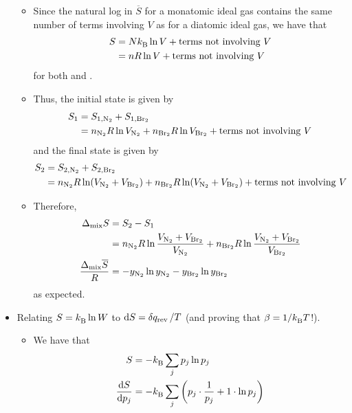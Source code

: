 \documentclass[../notes.tex]{subfiles}
\begin{document}
\begin{itemize}
    \begin{itemize}
        \item Since the natural log in $\overline{S}$ for a monatomic ideal gas contains the same number of terms involving $V$ as for a diatomic ideal gas, we have that
        \begin{align*}
            S &= N{k_\text{B}^{}}\ln V+\text{terms not involving }V\\
            &= nR\ln V+\text{terms not involving }V
        \end{align*}
        for both  and .
        \item Thus, the initial state is given by
        \begin{align*}
            S_1 &= S_{1,\ce{N2}}+S_{1,\ce{Br2}}\\
            &= n_{\ce{N2}}R\ln V_{\ce{N2}}+n_{\ce{Br2}}R\ln V_{\ce{Br2}}+\text{terms not involving }V
        \end{align*}
        and the final state is given by
        \begin{align*}
            S_2 &= S_{2,\ce{N2}}+S_{2,\ce{Br2}}\\
            &= n_{\ce{N2}}R\ln(V_{\ce{N2}}+V_{\ce{Br2}})+n_{\ce{Br2}}R\ln(V_{\ce{N2}}+V_{\ce{Br2}})+\text{terms not involving }V
        \end{align*}
        \item Therefore,
        \begin{align*}
            \Delta_\text{mix}S &= S_2-S_1\\
            &= n_{\ce{N2}}R\ln\frac{V_{\ce{N2}}+V_{\ce{Br2}}}{V_{\ce{N2}}}+n_{\ce{Br2}}R\ln\frac{V_{\ce{N2}}+V_{\ce{Br2}}}{V_{\ce{Br2}}}\\
            \frac{\Delta_\text{mix}\overline{S}}{R} &= -y_{\ce{N2}}\ln y_{\ce{N2}}-y_{\ce{Br2}}\ln y_{\ce{Br2}}
        \end{align*}
        as expected.
    \end{itemize}
    \item Relating $S={k_\text{B}^{}}\ln W$ to $\dd{S}=\var{q_\text{rev}}/T$ (and proving that $\beta=1/{k_\text{B}^{}} T$!).
    \begin{itemize}
        \item We have that
        \begingroup
        \allowdisplaybreaks
        \begin{align*}
            S &= -\kB\sum_jp_j\ln p_j\\
            \dv{S}{p_j} &= -\kB\sum_j\left( p_j\cdot\frac{1}{p_j}+1\cdot\ln p_j \right)\\

\end{align*}
\end{itemize}
\end{itemize}
\end{document}
